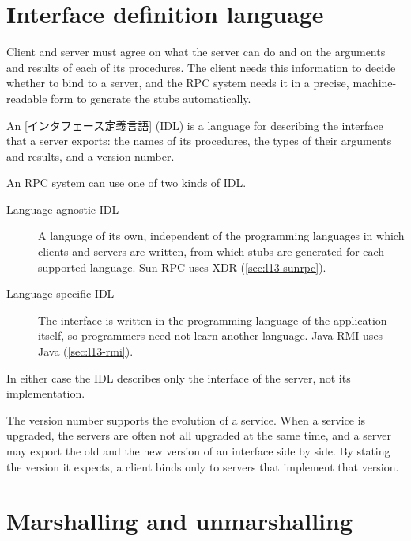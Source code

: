 \documentclass[../main.tex]{subfiles}
\begin{document}
\section{Interface definition language}
\label{sec:l13-idl}

Client and server must agree on what the server can do and on the
arguments and results of each of its procedures.  The client needs
this information to decide whether to bind to a server, and the RPC system
needs it in a precise, machine-readable form to generate the stubs
automatically.

\begin{definition}
  An [インタフェース定義言語] (IDL) is a
  language for describing the interface that a server exports: the names
  of its procedures, the types of their arguments and results, and a
  version number.
\end{definition}

An RPC system can use one of two kinds of IDL.
\begin{description}
  \item[Language-agnostic IDL] A language of its own, independent of the
    programming languages in which clients and servers are written, from
    which stubs are generated for each supported language.  Sun RPC uses
    XDR (\cref{sec:l13-sunrpc}).
  \item[Language-specific IDL] The interface is written in the programming
    language of the application itself, so programmers need not learn
    another language.  Java RMI uses Java (\cref{sec:l13-rmi}).
\end{description}
In either case the IDL describes only the interface of the server, not its
implementation.

The version number supports the evolution of a service.  When a service
is upgraded, the servers are often not all upgraded at the same time, and a
server may export the old and the new version of an interface side by
side.  By stating the version it expects, a client binds only to servers
that implement that version.

\section{Marshalling and unmarshalling}
\label{sec:l13-marshalling}
\end{document}
